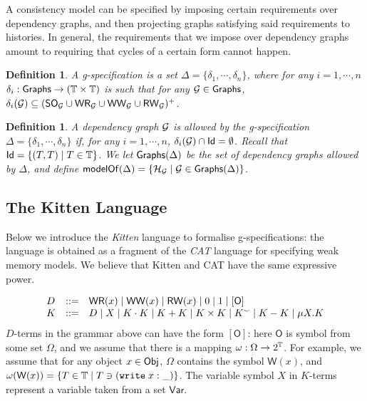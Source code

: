 \documentclass[a4paper,UKenglish]{article}%
\newif\ifdraft
\newcommand{\ac}[1]{\ifdraft{}{\color{blue}#1}\else{}\fi}
\newtheorem{definition}[theorem]{Definition}
\theoremstyle{plain}
\begin{document}
A consistency model can be specified by imposing certain requirements 
over dependency graphs, and then projecting graphs satisfying said 
requirements to histories. In general, the requirements that we 
impose over dependency graphs amount to requiring that cycles 
of a certain form cannot happen. 

\begin{definition}
A g-specification is a set $\Delta = \{\delta_1, \cdots, \delta_n\}$, 
where for any $i=1,\cdots, n$ $\delta_i : \mathsf{Graphs} \rightarrow (\mathbb{T} \times \mathbb{T})$ 
is such that for any $\mathcal{G} \in \mathsf{Graphs}$, $\delta_i(\mathcal{G}) \subseteq ({\sf{SO}}_{\mathcal{G}} \cup {\mathsf{WR}}_{\mathcal{G}} \cup {\mathsf{WW}}_{\mathcal{G}} \cup {\mathsf{RW}}_{\mathcal{G}})^{+}$.
\ac{Need to decide, it could be that I may want to admit also $\RF_{\G}^{-1}, \VO_{\G}^{-1}$ and $\AD_{\G}^{-1}$ 
as edges.}
\end{definition}

\begin{definition}
A dependency graph $\mathcal{G}$ is allowed by the g-specification $\Delta = \{\delta_1, \cdots, \delta_n\}$ if, 
for any $i=1,\cdots,n$, $\delta_i(\mathcal{G}) \cap \mathsf{Id} = \emptyset$. Recall that $\mathsf{Id} = \{(T, T) \mid T \in \mathbb{T}\}$.
We let $\mathsf{Graphs}(\Delta)$ be the set of dependency graphs allowed by $\Delta$, and define $\mathsf{modelOf}(\Delta) = 
\{\mathcal{H}_{\mathcal{G}} \mid \mathcal{G} \in \mathsf{Graphs}(\Delta) \}$.
\end{definition}

\subsection{The Kitten Language}
Below we introduce the \emph{Kitten} language to formalise g-specifications: the language 
is obtained as a fragment of the \emph{CAT} language for specifying weak 
memory models. We believe that Kitten and CAT have the same expressive power. 

\[
\begin{array}{lcl}
D &::=& {\mathsf{WR}}(x) \;\lvert\; {\mathsf{WW}}(x) \;\lvert\; {\mathsf{RW}}(x) \;\lvert\; 0 \;\lvert\; 1\;\lvert\; [\mathsf{O}]\\
K &::=& D \;\lvert\; X \;\lvert\; K \cdot K \;\lvert\; K + K \;\lvert\; K \times K \;\lvert\; K^{\smallsmile} \;\lvert\; K - K \;\lvert \; \mu X. K
\end{array}
\]
$D$-terms in the grammar above can have the form $[\mathsf{O}]$: here $\mathsf{O}$ is symbol from some set $\Omega$, and 
we assume that there is a mapping $\omega: \Omega \rightarrow 2^{\mathbb{T}}$. For example, we assume that for any 
object $x \in \mathsf{Obj}$, $\Omega$ contains the symbol $\mathsf{W}(x)$, and $\omega(\mathsf{W}(x)) = \{T \in \mathbb{T} \mid T \ni ({{\tt write}}\;x:\_)\}$.
The variable symbol $X$ in $K$-terms represent a variable taken from a set $\mathsf{Var}$.
\end{document}
